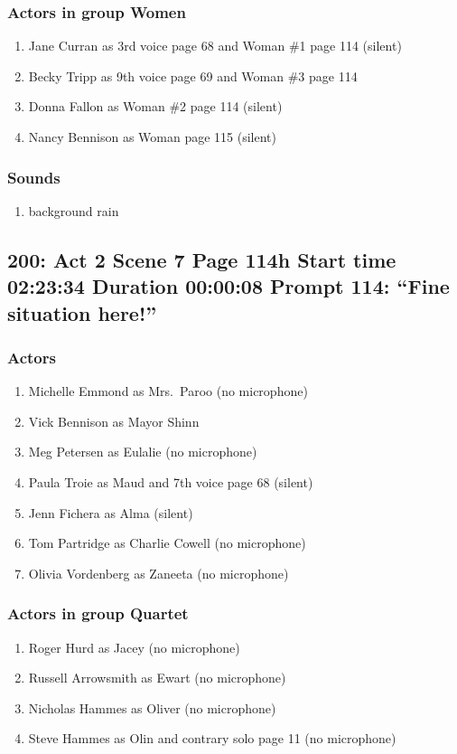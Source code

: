 \subsubsection{Actors in group Women}
\begin{enumerate}
\item Jane Curran as 3rd voice page 68 and Woman \#1 page 114 (silent)
\item Becky Tripp as 9th voice page 69 and Woman \#3 page 114
\item Donna Fallon as Woman \#2 page 114 (silent)
\item Nancy Bennison as Woman page 115 (silent)
\end{enumerate}

\subsubsection{Sounds}
\begin{enumerate}
\item background rain
\end{enumerate}
\subsection{200: Act 2 Scene 7 Page 114h Start time 02:23:34 Duration 00:00:08 Prompt 114: ``Fine situation here!''}

\subsubsection{Actors}
\begin{enumerate}
\item Michelle Emmond as Mrs.~Paroo (no microphone)
\item Vick Bennison as Mayor Shinn
\item Meg Petersen as Eulalie (no microphone)
\item Paula Troie as Maud and 7th voice page 68 (silent)
\item Jenn Fichera as Alma (silent)
\item Tom Partridge as Charlie Cowell (no microphone)
\item Olivia Vordenberg as Zaneeta (no microphone)
\end{enumerate}
\subsubsection{Actors in group Quartet}
\begin{enumerate}
\item Roger Hurd as Jacey (no microphone)
\item Russell Arrowsmith as Ewart (no microphone)
\item Nicholas Hammes as Oliver (no microphone)
\item Steve Hammes as Olin and contrary solo page 11 (no microphone)
\end{enumerate}
